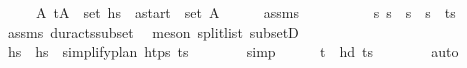 \begin{isabellebody}
\ \ \ \ \ {\isachardoublequoteopen}{\isasymexists}A{\isachardot}{\kern0pt}\ {\isacharparenleft}{\kern0pt}t\isactrlsub {\isasympi}{\isacharcomma}{\kern0pt}A{\isacharparenright}{\kern0pt}\ {\isasymin}\ set\ hs\ {\isasymand}\ a\isactrlsub s\isactrlsub t\isactrlsub a\isactrlsub r\isactrlsub t\ {\isasymin}\ set\ A{\isachardoublequoteclose}\isanewline
%
\isadelimproof
\ \ \ \ %
\endisadelimproof
%
\isatagproof
{}\isamarkupfalse%
\ assms\isanewline
\ \ \isamarkupfalse%
\ {\isacharminus}{\kern0pt}\isanewline
\ \ \ \ \isamarkupfalse%
\ {\isasympi}s\ {\isasympi}s\ \ {\isachardoublequoteopen}{\isasympi}s\ {\isacharequal}{\kern0pt}\ {\isasympi}s\ {\isacharat}{\kern0pt}\ {\isacharparenleft}{\kern0pt}{\isacharparenleft}{\kern0pt}t\isactrlsub {\isasympi}{\isacharcomma}{\kern0pt}{\isasympi}{\isacharparenright}{\kern0pt}{\isacharhash}{\kern0pt}{\isasympi}s\isanewline
\ \ \ \ \ \ \isamarkupfalse%
\ assms\ dur{\isacharunderscore}{\kern0pt}acts{\isacharunderscore}{\kern0pt}subset\ \isamarkupfalse%
\ {\isacharparenleft}{\kern0pt}meson\ split{\isacharunderscore}{\kern0pt}list\ subsetD{\isacharparenright}{\kern0pt}\isanewline
\ \ \ \ \isamarkupfalse%
\ \isamarkupfalse%
\ hs{\isacharprime}{\kern0pt}\ \ {\isachardoublequoteopen}hs{\isacharprime}{\kern0pt}\ {\isacharequal}{\kern0pt}\ simplify{\isacharunderscore}{\kern0pt}plan\ htps\ {\isacharparenleft}{\kern0pt}{\isacharparenleft}{\kern0pt}t\isactrlsub {\isasympi}{\isacharcomma}{\kern0pt}{\isasympi}{\isacharparenright}{\kern0pt}{\isacharhash}{\kern0pt}{\isasympi}s\isanewline
\ \ \ \ \ \ \isamarkupfalse%
\ simp\isanewline
\ \ \ \ \isamarkupfalse%
\ {\isachardoublequoteopen}{\isacharparenleft}{\kern0pt}t\isactrlsub {\isasympi}{\isacharcomma}{\kern0pt}{\isasympi}{\isacharparenright}{\kern0pt}\ {\isacharequal}{\kern0pt}\ hd\ {\isacharparenleft}{\kern0pt}{\isacharparenleft}{\kern0pt}t\isactrlsub {\isasympi}{\isacharcomma}{\kern0pt}{\isasympi}{\isacharparenright}{\kern0pt}{\isacharhash}{\kern0pt}{\isasympi}s\isanewline
\ \ \ \ \ \ \isamarkupfalse%
\ auto\isanewline

\end{isabellebody}
